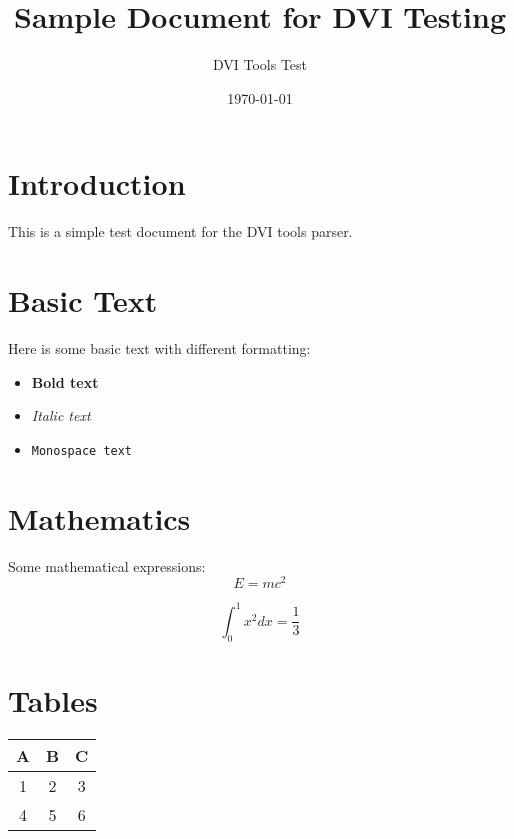 \documentclass{article}
\title{Sample Document for DVI Testing}
\author{DVI Tools Test}
\date{\today}
\begin{document}
\maketitle

\section{Introduction}
This is a simple test document for the DVI tools parser.

\section{Basic Text}
Here is some basic text with different formatting:
\begin{itemize}
\item \textbf{Bold text}
\item \textit{Italic text}
\item \texttt{Monospace text}
\end{itemize}

\section{Mathematics}
Some mathematical expressions:
\begin{equation}
E = mc^2
\end{equation}

\begin{equation}
\int_0^1 x^2 dx = \frac{1}{3}
\end{equation}

\section{Tables}
\begin{center}
\begin{tabular}{|c|c|c|}
\hline
A & B & C \\
\hline
1 & 2 & 3 \\
4 & 5 & 6 \\
\hline
\end{tabular}
\end{center}
\end{document}

